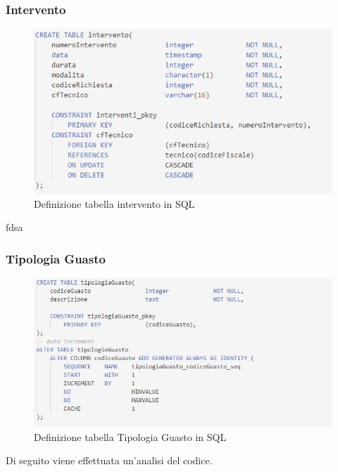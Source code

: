 \documentclass[legalpaper]{article}
\begin{document}
	\subsubsection{Intervento}
		\begin{figure}[h]
			\centering
			\includegraphics[width=0.9\linewidth]{Immagini SQL/intervento}
			\caption{Definizione tabella intervento in SQL}
			\label{interventosql}
		\end{figure}
		fdsa \\

	\subsubsection{Tipologia Guasto}
		\begin{figure}[h]
			\centering
			\includegraphics[width=0.9\linewidth]{Immagini SQL/tipologiaGuasto}
			\caption{Definizione tabella Tipologia Guasto in SQL}
			\label{tipologiaGuastosql}
		\end{figure}
		Di seguito viene effettuata un'analisi del codice. \\
\newpage
\end{document}
